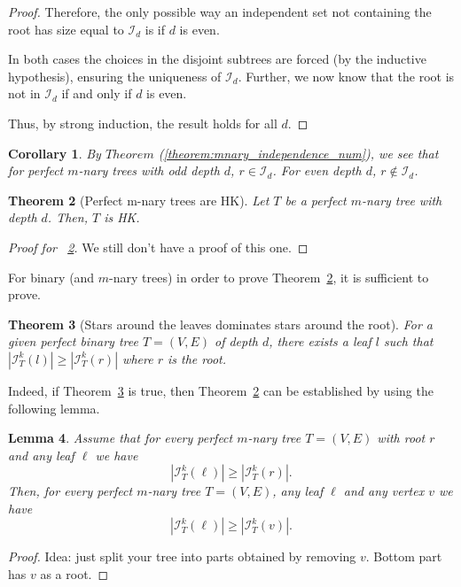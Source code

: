 \documentclass{amsart}
\newtheorem{theorem}{Theorem}[section]
\newtheorem{lemma}[theorem]{Lemma}
\newtheorem{corollary}[theorem]{Corollary}
\theoremstyle{definition}
\newcommand\II{{\mathcal I}}
\begin{document}
\begin{proof}
	Therefore, the only possible way an independent set not containing the root has size equal to $\II_d$ is if $d$ is even.

	\medskip

	In both cases the choices in the disjoint subtrees are forced (by the inductive hypothesis), ensuring the uniqueness of $\mathcal{I}_{d}$. Further, we now know that the root is not in $\mathcal{I}_{d}$ if and only if $d$ is even.

	Thus, by strong induction, the result holds for all $d$.
\end{proof}


\begin{corollary}\label{cor:root_in_not_in}
	By $Theorem$ (\ref{theorem:mnary_independence_num}), we see that for perfect $m$-nary trees with odd depth $d$, $r \in \mathcal{I}_d$. For even depth $d$, $r \not\in \mathcal{I}_d$.
\end{corollary}


\begin{theorem}[Perfect m-nary trees are HK]\label{theorem:mnary_hk}
	Let $T$ be a perfect $m$-nary tree with depth $d$. Then, $T$ is HK.
\end{theorem}

\begin{proof}[Proof for ~\ref{theorem:mnary_hk}]
	We still don't have a proof of this one.
\end{proof}


For binary (and $m$-nary trees) in order to prove Theorem~\ref{theorem:mnary_hk}, it is sufficient to prove.
\begin{theorem}[Stars around the leaves dominates stars around the root]\label{theorem:leaves_dom_root}
	For a given perfect binary tree $T = (V, E)$	of depth $d$, there exists a leaf $l$ such that $|\mathcal{I}^k_T(l)| \geq  |\mathcal{I}^k_T(r)|$ where $r$ is the root.
\end{theorem}

Indeed, if Theorem~\ref{theorem:leaves_dom_root} is true, then Theorem~\ref{theorem:mnary_hk} can be established by using the following lemma.

\begin{lemma}
	Assume that for every perfect $m$-nary  tree $T = (V, E)$ with root $r$ and any leaf $\ell$ we have $$|\mathcal{I}^k_T(\ell)| \geq  |\mathcal{I}^k_T(r)|.$$
	Then, for every perfect $m$-nary  tree $T = (V, E)$, any leaf $\ell$ and any vertex $v$ we have $$|\mathcal{I}^k_T(\ell)| \geq  |\mathcal{I}^k_T(v)|.$$
\end{lemma}
\begin{proof}
	Idea: just split your tree into parts obtained by removing $v$. Bottom part has $v$ as a root.
\end{proof}
\end{document}
